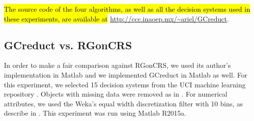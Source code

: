 \documentclass[number,preprint,review,12pt]{elsarticle}
\begin{document}
	\hl{The source code of the four algorithms, as well as all the decision systems used in these experiments, are available at} \url{http://ccc.inaoep.mx/~ariel/GCreduct}.
	
\subsection{GCreduct vs. RGonCRS}\label{sub:matlab}
	In order to make a fair comparison against RGonCRS, we used its author's implementation in Matlab and we implemented GCreduct in Matlab as well. For this experiment, we selected 15 decision systems from the UCI machine learning repository \citep{Bache13}. Objects with missing data were removed as in \citep{WangP07}. For numerical attributes, we used the Weka's equal width discretization filter with 10 bins, as describe in \cite{Flores2010}. This experiment was run using Matlab R2015a.
	
\end{document}
